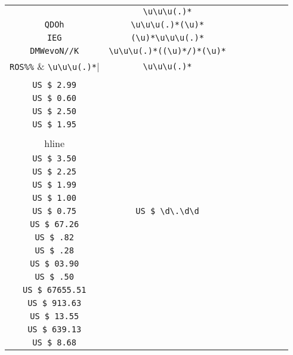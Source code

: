 \begin{longtable}{cccccccc}
\begin{tabular}{ll}
    \verb|JWRjV68@6?Es| & \verb|\u\u\u(.)*|\\
\verb|QDOh| & \verb|\u\u\u(.)*(\u)*|\\
\verb|IEG| & \verb|(\u)*\u\u\u(.)*|\\
\verb|DMWevoN//K| & \verb|\u\u\u(.)*((\u)*/)*(\u)*|\\
\verb|ROS%%| & \verb|\u\u\u(.)*|
\end{tabular}
\\\midrule 
\begin{tabular}{l}
    \verb|US $ 2.95|\\
\verb|US $ 2.99|\\
\verb|US $ 0.60|\\
\verb|US $ 2.50|\\
\verb|US $ 1.95|\\
\\hline\\
\verb|US $ 3.50|\\
\verb|US $ 2.25|\\
\verb|US $ 1.99|\\
\verb|US $ 1.00|\\
\verb|US $ 0.75|
\end{tabular}

&
\verb|US $ \d\.\d\d|
&

\begin{tabular}{l}
    \verb|US $ (\d)*\.\d\d|\\
\verb|US $ 67.26|\\
\verb|US $ .82|\\
\verb|US $ .28|\\
\verb|US $ 03.90|\\
\verb|US $ .50|
\end{tabular}

&

\begin{tabular}{l}
    \verb|US $ \d(\d)*\.\d\d|\\
\verb|US $ 67655.51|\\
\verb|US $ 913.63|\\
\verb|US $ 13.55|\\
\verb|US $ 639.13|\\
\verb|US $ 8.68|
\end{tabular}

&


\end{longtable}

